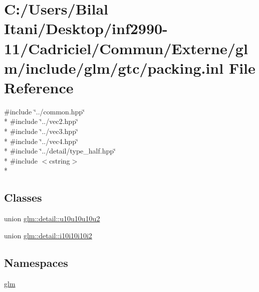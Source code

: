 \hypertarget{packing_8inl}{}\section{C\+:/\+Users/\+Bilal Itani/\+Desktop/inf2990-\/11/\+Cadriciel/\+Commun/\+Externe/glm/include/glm/gtc/packing.inl File Reference}
\label{packing_8inl}
{\ttfamily \#include \char`\"{}../common.\+hpp\char`\"{}}\\*
{\ttfamily \#include \char`\"{}../vec2.\+hpp\char`\"{}}\\*
{\ttfamily \#include \char`\"{}../vec3.\+hpp\char`\"{}}\\*
{\ttfamily \#include \char`\"{}../vec4.\+hpp\char`\"{}}\\*
{\ttfamily \#include \char`\"{}../detail/type\+\_\+half.\+hpp\char`\"{}}\\*
{\ttfamily \#include $<$cstring$>$}\\*
\subsection*{Classes}
\begin{DoxyCompactItemize}
\item 
union \hyperlink{unionglm_1_1detail_1_1u10u10u10u2}{glm\+::detail\+::u10u10u10u2}
\item 
union \hyperlink{unionglm_1_1detail_1_1i10i10i10i2}{glm\+::detail\+::i10i10i10i2}
\end{DoxyCompactItemize}
\subsection*{Namespaces}
\begin{DoxyCompactItemize}
\item 
 \hyperlink{namespaceglm}{glm}
\end{DoxyCompactItemize}
